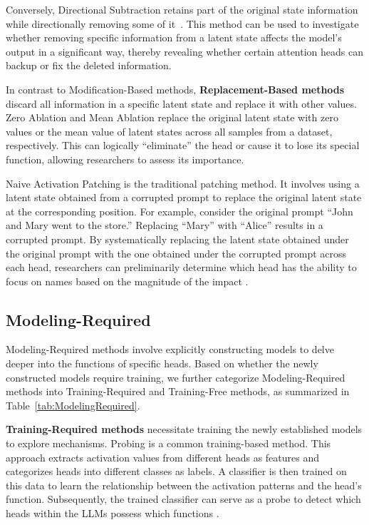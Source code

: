 \documentclass{article}
\begin{document}
Conversely, Directional Subtraction retains part of the original state information while directionally removing some of it~\citep{SurveyCTG_24_arXiv_RUC}. This method can be used to investigate whether removing specific information from a latent state affects the model's output in a significant way, thereby revealing whether certain attention heads can backup or fix the deleted information.

In contrast to Modification-Based methods, \textbf{Replacement-Based methods} discard all information in a specific latent state and replace it with other values.
Zero Ablation and Mean Ablation replace the original latent state with zero values or the mean value of latent states across all samples from a dataset, respectively. This can logically ``eliminate'' the head or cause it to lose its special function, allowing researchers to assess its importance.

Naive Activation Patching is the traditional patching method. It involves using a latent state obtained from a corrupted prompt to replace the original latent state at the corresponding position. For example, consider the original prompt ``John and Mary went to the store.'' Replacing ``Mary'' with ``Alice'' results in a corrupted prompt. By systematically replacing the latent state obtained under the original prompt with the one obtained under the corrupted prompt across each head, researchers can preliminarily determine which head has the ability to focus on names based on the magnitude of the impact \citep{ActivationPatching_24_arXiv_Google, ActivationPatching_24_ICLR_Google}.


\subsection{Modeling-Required} \label{subsec:ModelRequired}

Modeling-Required methods involve explicitly constructing models to delve deeper into the functions of specific heads. Based on whether the newly constructed models require training, we further categorize Modeling-Required methods into Training-Required and Training-Free methods, as summarized in Table~\ref{tab:ModelingRequired}.

\textbf{Training-Required methods} necessitate training the newly established models to explore mechanisms.
Probing is a common training-based method. This approach extracts activation values from different heads as features and categorizes heads into different classes as labels. A classifier is then trained on this data to learn the relationship between the activation patterns and the head's function. Subsequently, the trained classifier can serve as a probe to detect which heads within the LLMs possess which functions \citep{SemanticConsistency_24_ACL_TJU, ITI_23_NIPS_harvard}.
\end{document}
